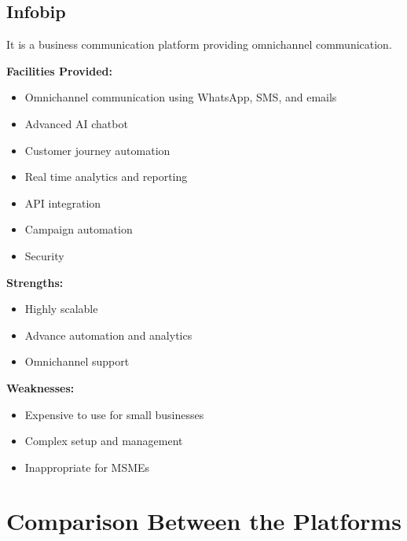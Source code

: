 
\subsection{Infobip}

It is a business communication platform providing omnichannel communication.

\textbf{Facilities Provided:}
\begin{itemize}
    \item Omnichannel communication using WhatsApp, SMS, and emails
    \item Advanced AI chatbot
    \item Customer journey automation
    \item Real time analytics and reporting
    \item API integration
    \item Campaign automation
    \item Security
\end{itemize}

\textbf{Strengths:}
\begin{itemize}
    \item Highly scalable
    \item Advance automation and analytics
    \item Omnichannel support
\end{itemize}

\textbf{Weaknesses:}
\begin{itemize}
    \item Expensive to use for small businesses
    \item Complex setup and management
    \item Inappropriate for MSMEs
\end{itemize}


\section{Comparison Between the Platforms}

